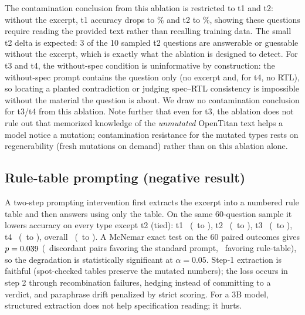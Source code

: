 \documentclass[11pt]{article}
\begin{document}
The contamination conclusion from this ablation is restricted to t1 and t2: without the excerpt, t1 accuracy drops to \AblWithoutAccTone\% and t2 to \AblWithoutAccTtwo\%, showing these questions require reading the provided text rather than recalling training data. The small t2 delta is expected: 3 of the 10 sampled t2 questions are answerable or guessable without the excerpt, which is exactly what the ablation is designed to detect. For t3 and t4, the without-spec condition is uninformative by construction: the without-spec prompt contains the question only (no excerpt and, for t4, no RTL), so locating a planted contradiction or judging spec--RTL consistency is impossible without the material the question is about. We draw no contamination conclusion for t3/t4 from this ablation. Note further that even for t3, the ablation does not rule out that memorized knowledge of the \emph{unmutated} OpenTitan text helps a model notice a mutation; contamination resistance for the mutated types rests on regenerability (fresh mutations on demand) rather than on this ablation alone.

\subsection{Rule-table prompting (negative result)}
A two-step prompting intervention first extracts the excerpt into a numbered rule table and then answers using only the table. On the same 60-question sample it lowers accuracy on every type except t2 (tied): t1 \RuleDeltaTone\ (\AblWithTone\ to \RuleTone), t2 \RuleDeltaTtwo\ (\AblWithTtwo\ to \RuleTtwo), t3 \RuleDeltaTthree\ (\AblWithTthree\ to \RuleTthree), t4 \RuleDeltaTfour\ (\AblWithTfour\ to \RuleTfour), overall \RuleDeltaOverall\ (\AblWithOverall\ to \RuleOverall). A McNemar exact test on the 60 paired outcomes gives $p=0.039$ (\RuleMcNemarB\ discordant pairs favoring the standard prompt, \RuleMcNemarC\ favoring rule-table), so the degradation is statistically significant at $\alpha=0.05$. Step-1 extraction is faithful (spot-checked tables preserve the mutated numbers); the loss occurs in step 2 through recombination failures, hedging instead of committing to a verdict, and paraphrase drift penalized by strict scoring. For a 3B model, structured extraction does not help specification reading; it hurts.
\end{document}
